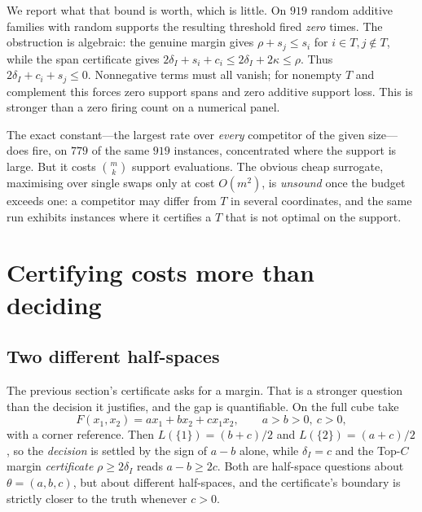 We report what that bound is worth, which is little. On $919$ random additive families with
random supports the resulting threshold fired \emph{zero} times. The obstruction is algebraic: the genuine margin gives $\rho+s_j\le s_i$ for
$i\in T,j\notin T$, while the span certificate gives
$2\delta_I+s_i+c_i\le2\delta_I+2\kappa\le\rho$. Thus
$2\delta_I+c_i+s_j\le0$. Nonnegative terms must all vanish; for nonempty $T$ and
complement this forces zero support spans and zero additive support loss. This is stronger
than a zero firing count on a numerical panel.

The exact constant---the largest rate over \emph{every} competitor of the given size---does
fire, on $779$ of the same $919$ instances, concentrated where the support is large. But it
costs $\binom{m}{k}$ support evaluations. The obvious cheap surrogate, maximising over
single swaps only at cost $O(m^{2})$, is \emph{unsound} once the budget exceeds one: a
competitor may differ from $T$ in several coordinates, and the same run exhibits instances
where it certifies a $T$ that is not optimal on the support. \NUM{}


\section{Certifying costs more than deciding}
\label{sec:oracle}

\subsection{Two different half-spaces}

The previous section's certificate asks for a margin. That is a stronger question than the
decision it justifies, and the gap is quantifiable. On the full cube take
\begin{equation}
F(x_{1},x_{2})=ax_{1}+bx_{2}+cx_{1}x_{2},\qquad a>b>0,\ c>0 ,
\label{eq:abc}
\end{equation}
with a corner reference. Then $L(\{1\})=(b+c)/2$ and $L(\{2\})=(a+c)/2$, so the
\emph{decision} is settled by the sign of $a-b$ alone, while $\delta_{I}=c$ and the Top-$C$
margin \emph{certificate} $\rho\ge2\delta_{I}$ reads $a-b\ge2c$. Both are half-space
questions about $\theta=(a,b,c)$, but about different half-spaces, and the certificate's
boundary is strictly closer to the truth whenever $c>0$.

